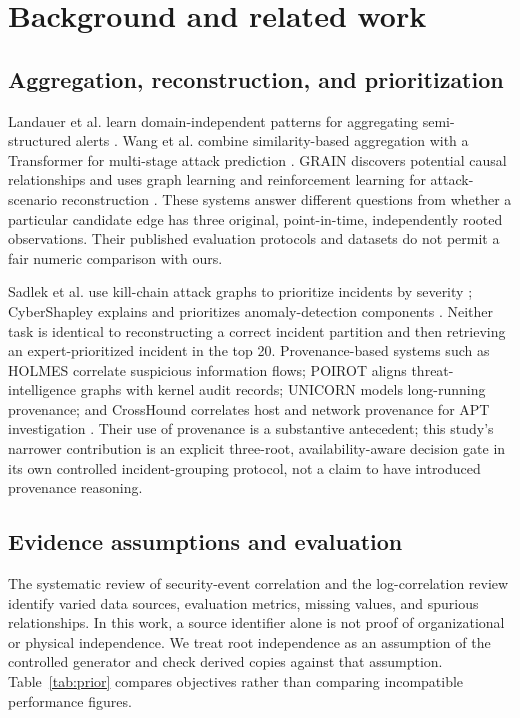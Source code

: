 \section{Background and related work}
\subsection{Aggregation, reconstruction, and prioritization}
Landauer et al. learn domain-independent patterns for aggregating semi-structured alerts \cite{landauer2022}. Wang et al. combine similarity-based aggregation with a Transformer for multi-stage attack prediction \cite{wang2024}. GRAIN discovers potential causal relationships and uses graph learning and reinforcement learning for attack-scenario reconstruction \cite{grain2025}. These systems answer different questions from whether a particular candidate edge has three original, point-in-time, independently rooted observations. Their published evaluation protocols and datasets do not permit a fair numeric comparison with ours.

Sadlek et al. use kill-chain attack graphs to prioritize incidents by severity \cite{sadlek2025}; CyberShapley explains and prioritizes anomaly-detection components \cite{malach2025}. Neither task is identical to reconstructing a correct incident partition and then retrieving an expert-prioritized incident in the top 20. Provenance-based systems such as HOLMES correlate suspicious information flows; POIROT aligns threat-intelligence graphs with kernel audit records; UNICORN models long-running provenance; and CrossHound correlates host and network provenance for APT investigation \cite{holmes2019,poirot2019,unicorn2020,crosshound2026}. Their use of provenance is a substantive antecedent; this study's narrower contribution is an explicit three-root, availability-aware decision gate in its own controlled incident-grouping protocol, not a claim to have introduced provenance reasoning.

\subsection{Evidence assumptions and evaluation}
The systematic review of security-event correlation \cite{review2022} and the log-correlation review \cite{chuah2025} identify varied data sources, evaluation metrics, missing values, and spurious relationships. In this work, a source identifier alone is not proof of organizational or physical independence. We treat root independence as an assumption of the controlled generator and check derived copies against that assumption. Table~\ref{tab:prior} compares objectives rather than comparing incompatible performance figures.

